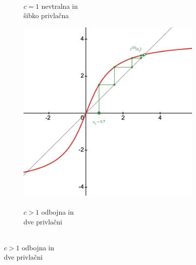 \documentclass{article}
\begin{document}
\begin{figure}[h]
\begin{subfigure}[c]{0.28\textwidth}
        \caption{\\$c=1$ nevtralna in\\šibko privlačna}
        \label{fig:cobweb32}
    \end{subfigure}
    \begin{subfigure}[c]{0.28\textwidth}
        \centering
        \includegraphics[width=\textwidth]{Grafi/cobweb173.png}
        \caption{\\$c>1$ odbojna in\\dve privlačni}
        \label{fig:cobweb33}
    \end{subfigure}
\end{figure}



%
%

\end{document}
